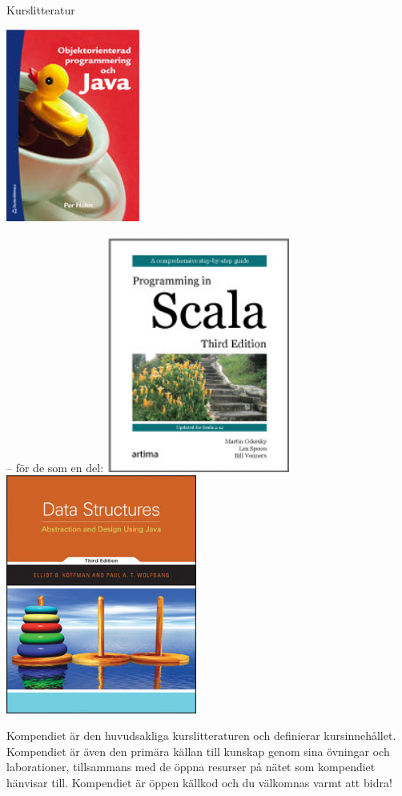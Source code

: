 \begin{Slide}{Kurslitteratur}
\begin{minipage}{0.5\textwidth}
\includegraphics[width=0.33\textwidth]{../img/ankbok.jpg}

\noindent -- för de som  en del:
\vskip0.7mm
\includegraphics[width=0.45\textwidth]{../img/pinsbook.jpg}\hskip4mm
\includegraphics[width=0.47\textwidth]{../img/koffmanbook.jpg}
\end{minipage}
\end{Slide}

\ifkompendium
\noindent Kompendiet är den huvudsakliga kurslitteraturen och definierar kursinnehållet. Kompendiet är även den primära källan till kunskap genom sina övningar och laborationer, tillsammans med de öppna resurser på nätet som kompendiet hänvisar till. Kompendiet är öppen källkod och du välkomnas varmt att bidra!

